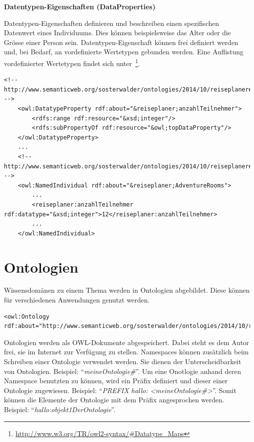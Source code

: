 \textbf{Datentypen-Eigenschaften (DataProperties)}

Datentypen-Eigenschaften definieren und beschreiben einen spezifischen Datenwert eines Individuums. Dies können beispielsweise das Alter oder die Grösse einer Person sein. Datentypen-Eigenschaft können frei definiert werden und, bei Bedarf, an vordefinierte Wertetypen gebunden werden. Eine Auflistung vordefinierter Wertetypen findet sich unter~\footnote{\url{http://www.w3.org/TR/owl2-syntax/\#Datatype_Maps}}.

\begin{lstlisting}[caption={Beispiel der Datentypen-Eigenschaft \textit{anzahlTeilnehmer} und deren Anwendung bei einem Individuum}]
    <!-- http://www.semanticweb.org/sosterwalder/ontologies/2014/10/reiseplaner#anzahlTeilnehmer -->
    <owl:DatatypeProperty rdf:about="&reiseplaner;anzahlTeilnehmer">
        <rdfs:range rdf:resource="&xsd;integer"/>
        <rdfs:subPropertyOf rdf:resource="&owl;topDataProperty"/>
    </owl:DatatypeProperty>
    ...
    <!-- http://www.semanticweb.org/sosterwalder/ontologies/2014/10/reiseplaner#AdventureRooms -->
    <owl:NamedIndividual rdf:about="&reiseplaner;AdventureRooms">
        ...
        <reiseplaner:anzahlTeilnehmer rdf:datatype="&xsd;integer">12</reiseplaner:anzahlTeilnehmer>
        ...
    </owl:NamedIndividual>
\end{lstlisting}

\newpage

\section{Ontologien}
\label{sec:owl_owl_Ontologien}

Wissensdomänen zu einem Thema werden in Ontologien abgebildet. Diese können für verschiedenen Anwendungen genutzt werden.

\begin{lstlisting}[caption={Beispiel einer Definition einer Ontologie}]
    <owl:Ontology rdf:about="http://www.semanticweb.org/sosterwalder/ontologies/2014/10/reiseplaner"/>
\end{lstlisting}

Ontologien werden als OWL-Dokumente abgespeichert. Dabei steht es dem Autor frei, sie im Internet zur Verfügung zu stellen.
Namespaces können zusätzlich beim Schreiben einer Ontologie verwendet werden. Sie dienen der Unterscheidbarkeit von Ontologien. Beispiel: ``\textit{meineOntologie\#}''. Um eine Onotlogie anhand deren Namespace benutzten zu können, wird ein Präfix definiert und dieser einer Ontologie zugewiesen. Beispiel: ``\textit{PREFIX hallo: <meineOntologie\#>}''. Somit können die Elemente der Ontologie mit dem Präfix angesprochen werden. Beispiel: ``\textit{hallo:objekt1DerOntologie}''.

